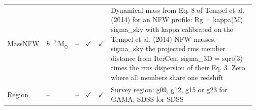\begin{tabular}{llcccp{7.5cm}}
MassNFW & $h^{-1}\,\mathrm{M}_\odot$ & -- & $\checkmark$ & $\checkmark$ & Dynamical mass from Eq. 8 of Tempel et al. (2014) for an NFW profile: Rg = kappa(M) sigma\_sky with kappa calibrated on the Tempel et al. (2014) NFW masses, sigma\_sky the projected rms member distance from IterCen, sigma\_3D = sqrt(3) times the rms dispersion of their Eq. 3. Zero where all members share one redshift \\
Region & -- & -- & $\checkmark$ & $\checkmark$ & Survey region: g09, g12, g15 or g23 for GAMA; SDSS for SDSS \\
\hline
\end{tabular}
